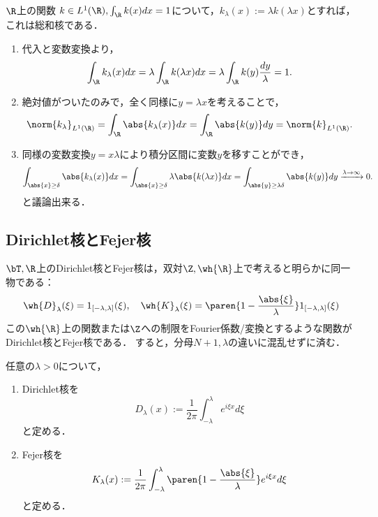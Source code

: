 \documentclass[uplatex,dvipdfmx]{jsreport}
\begin{document}
\begin{proposition}[総和核の構成法]\label{prop-construction-of-summability-kernel}
    $\R$上の関数
    $k\in L^1(\R),\int_\R k(x)dx=1$について，$k_\lambda(x):=\lambda k(\lambda x)$とすれば，これは総和核である．
\end{proposition}
\begin{Proof}\mbox{}
    \begin{enumerate}
        \item 代入と変数変換より，
        \begin{align*}
            \int_\R k_\lambda(x)dx=\lambda\int_\R k(\lambda x)dx=\lambda\int_\R k(y)\frac{dy}{\lambda}=1.
        \end{align*}
        \item 絶対値がついたのみで，全く同様に$y=\lambda x$を考えることで，
        \begin{align*}
            \norm{k_\lambda}_{L^1(\R)}=\int_\R \abs{k_\lambda(x)}dx=\int_\R\abs{k(y)}dy=\norm{k}_{L^1(\R)}.
        \end{align*}
        \item 同様の変数変換$y=x\lambda$により積分区間に変数$y$を移すことができ，
        \[\int_{\abs{x}\ge\delta}\abs{k_\lambda(x)}dx=\int_{\abs{x}\ge\delta}\lambda\abs{k(\lambda x)}dx=\int_{\abs{y}\ge\lambda\delta}\abs{k(y)}dy\xrightarrow{\lambda\to\infty}0.\]
        と議論出来る．
    \end{enumerate}
\end{Proof}

\subsection{Dirichlet核とFejer核}

\begin{tcolorbox}[colframe=ForestGreen, colback=ForestGreen!10!white,breakable,colbacktitle=ForestGreen!40!white,coltitle=black,fonttitle=\bfseries\sffamily,
title=]
    $\bT,\R$上のDirichlet核とFejer核は，双対$\Z,\wh{\R}$上で考えると明らかに同一物である：
    \[\wh{D}_\lambda(\xi)=1_{[-\lambda,\lambda]}(\xi),\quad\wh{K}_\lambda(\xi)=\paren{1-\frac{\abs{\xi}}{\lambda}}1_{[-\lambda,\lambda]}(\xi)\]
    この$\wh{\R}$上の関数または$\Z$への制限をFourier係数/変換とするような関数がDirichlet核とFejer核である．
    すると，分母$N+1,\lambda$の違いに混乱せずに済む．
\end{tcolorbox}

\begin{definition}\label{def-Fejer-kernel-on-R}
    任意の$\lambda>0$について，
    \begin{enumerate}
        \item Dirichlet核を
        \[D_\lambda(x):=\frac{1}{2\pi}\int^\lambda_{-\lambda}e^{i\xi x}d\xi\]
        と定める．
        \item Fejer核を
        \[K_\lambda(x):=\frac{1}{2\pi}\int^\lambda_{-\lambda}\paren{1-\frac{\abs{\xi}}{\lambda}}e^{i\xi x}d\xi\]
        と定める．
    \end{enumerate}
\end{definition}
\end{document}
